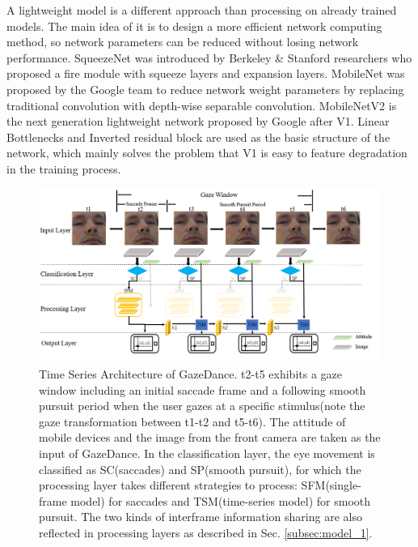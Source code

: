 \documentclass[acmlarge]{acmart}
\begin{document}
A lightweight model is a different approach than processing on already trained models. The main idea of it is to design a more efficient network computing method, so network parameters can be reduced without losing network performance. SqueezeNet \cite{iandola2016squeezenet} was introduced by Berkeley \& Stanford researchers who proposed a fire module with squeeze layers and expansion layers. MobileNet \cite{howard2017mobilenets} was proposed by the Google team to reduce network weight parameters by replacing traditional convolution with depth-wise separable convolution. MobileNetV2 \cite{sandler2018mobilenetv2} is the next generation lightweight network proposed by Google after V1. Linear Bottlenecks and Inverted residual block are used as the basic structure of the network, which mainly solves the problem that V1 is easy to feature degradation in the training process.

\begin{figure} 
  \centering
  \includegraphics[scale=0.5]{pictures/time_flow_2.jpg}
  \caption{Time Series Architecture of GazeDance. t2-t5 exhibits a gaze window including an initial saccade frame and a following smooth pursuit period when the user gazes at a specific stimulus(note the gaze transformation between t1-t2 and t5-t6). The attitude of mobile devices and the image from the front camera are taken as the input of GazeDance. In the classification layer, the eye movement is classified as SC(saccades) and SP(smooth pursuit), for which the processing layer takes different strategies to process: SFM(single-frame model) for saccades and TSM(time-series model) for smooth pursuit. The two kinds of interframe information sharing are also reflected in processing layers as described in Sec. \ref{subsec:model_1}.}
  \label{fig: time_flow}
\end{figure}
\end{document}
